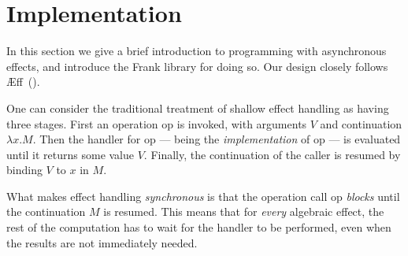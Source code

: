 \documentclass[msc,deptreport,cs]{infthesis} %
\newcommand\aeff{{\AE}ff\xspace}
\newcommand{\todo}[1]
           {{\par\noindent\small\color{RoyalPurple}
  \framebox{\parbox{\dimexpr\linewidth-2\fboxsep-2\fboxrule}
    {\textbf{TODO:} #1}}}}
\begin{document}

\chapter{Implementation}
\label{chap:implementation}


In this section we give a brief introduction to programming with asynchronous
effects, and introduce the Frank library for doing so.
%
Our design closely follows \aeff~(\cite{ahman2020asynchronous}).

One can consider the traditional treatment of shallow effect handling as having
three stages. First an operation \textsf{op} is invoked, with arguments $V$ and
continuation $\lambda x . M$. Then the handler for \textsf{op} --- being the
\emph{implementation} of \textsf{op} --- is evaluated until it returns some
value $V$. Finally, the continuation of the caller is resumed by binding $V$ to
$x$ in $M$.


What makes effect handling \emph{synchronous} is that the operation call
\textsf{op} \emph{blocks} until the continuation $M$ is resumed. This means that
for \emph{every} algebraic effect, the rest of the computation has to wait for
the handler to be performed, even when the results are not immediately needed.
\end{document}
